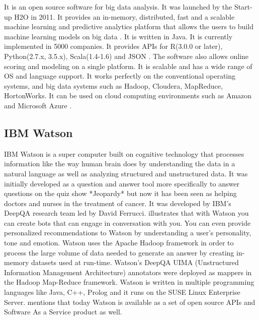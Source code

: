     It is an open source software for big data analysis. It was
    launched by the Start-up H2O in 2011. It provides an in-memory,
    distributed, fast and a scalable machine learning and predictive
    analytics platform that allows the users to build machine learning
    models on big data \cite{www-H2O-website}. It is written in
    Java. It is currently implemented in 5000 companies. It provides
    APIs for R(3.0.0 or later), Python(2.7.x, 3.5.x), Scala(1.4-1.6)
    and JSON \cite{www-H2O-book}. The software also allows online
    scoring and modeling on a single platform.  It is scalable and has
    a wide range of OS and language support. It works perfectly on the
    conventional operating systems, and big data systems such as
    Hadoop, Cloudera, MapReduce, HortonWorks.  It can be used on cloud
    computing environments such as Amazon and Microsoft Azure
    \cite{www-H2O-wiki}.


\subsection{IBM Watson}

    IBM Watson \cite{www-ibmwatson-wiki} is a super computer built on
    cognitive technology that processes information like the way human
    brain does by understanding the data in a natural language as well
    as analyzing structured and unstructured data. It was initially
    developed as a question and answer tool more specifically to
    answer questions on the quiz show *Jeopardy* but now it has been
    seen as helping doctors and nurses in the treatment of cancer. It
    was developed by IBM's DeepQA research team led by David
    Ferrucci. \cite{www-ibmwatson} illustrates that with Watson you
    can create bots that can engage in conversation with you. You can
    even provide personalized recommendations to Watson by
    understanding a user's personality, tone and emotion. Watson uses
    the Apache Hadoop framework in order to process the large volume
    of data needed to generate an answer by creating in-memory
    datasets used at run-time. Watson's DeepQA UIMA (Unstructured
    Information Management Architecture) annotators were deployed as
    mappers in the Hadoop Map-Reduce framework. Watson is written in
    multiple programming languages like Java, C++, Prolog and it runs
    on the SUSE Linux Enterprise Server. \cite{www-ibmwatson}
    mentions that today Watson is available as a set of open source
    APIs and Software As a Service product as well.
    
